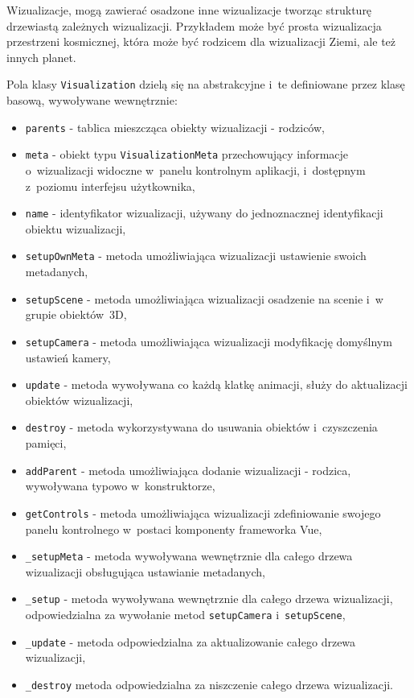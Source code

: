 Wizualizacje, mogą zawierać osadzone inne wizualizacje tworząc strukturę drzewiastą zależnych wizualizacji. Przykładem może być prosta wizualizacja przestrzeni kosmicznej, która może być rodzicem dla wizualizacji Ziemi, ale też innych planet.
\begin{samepage}
    Pola klasy \texttt{Visualization} dzielą się na abstrakcyjne i~te definiowane przez klasę basową, wywoływane wewnętrznie:


    \begin{itemize}
        \item \texttt{parents} - tablica mieszcząca obiekty wizualizacji - rodziców,
        \item \texttt{meta} - obiekt typu \texttt{VisualizationMeta} przechowujący informacje o~wizualizacji widoczne w~panelu kontrolnym aplikacji, i~dostępnym z~poziomu interfejsu użytkownika,
        \item \texttt{name} - identyfikator wizualizacji, używany do jednoznacznej identyfikacji obiektu wizualizacji,
        \item \texttt{setupOwnMeta} - metoda umożliwiająca wizualizacji ustawienie swoich metadanych,
        \item \texttt{setupScene} - metoda umożliwiająca wizualizacji osadzenie na scenie i~w grupie obiektów~3D,
        \item \texttt{setupCamera} - metoda umożliwiająca wizualizacji modyfikację domyślnym ustawień kamery,
        \item \texttt{update} - metoda wywoływana co każdą klatkę animacji, służy do aktualizacji obiektów wizualizacji,
        \item \texttt{destroy} - metoda wykorzystywana do usuwania obiektów i~czyszczenia pamięci,
        \item \texttt{addParent} - metoda umożliwiająca dodanie wizualizacji - rodzica, wywoływana typowo w~konstruktorze,
        \item \texttt{getControls} - metoda umożliwiająca wizualizacji zdefiniowanie swojego panelu kontrolnego w~postaci komponenty frameworka Vue,
        \item \texttt{\_setupMeta} - metoda wywoływana wewnętrznie dla całego drzewa wizualizacji obsługująca ustawianie metadanych,
        \item \texttt{\_setup} - metoda wywoływana wewnętrznie dla całego drzewa wizualizacji, odpowiedzialna za wywołanie metod \texttt{setupCamera} i~\texttt{setupScene},
        \item \texttt{\_update} - metoda odpowiedzialna za aktualizowanie całego drzewa wizualizacji,
        \item \texttt{\_destroy} metoda odpowiedzialna za niszczenie całego drzewa wizualizacji.
    \end{itemize}
\end{samepage}

